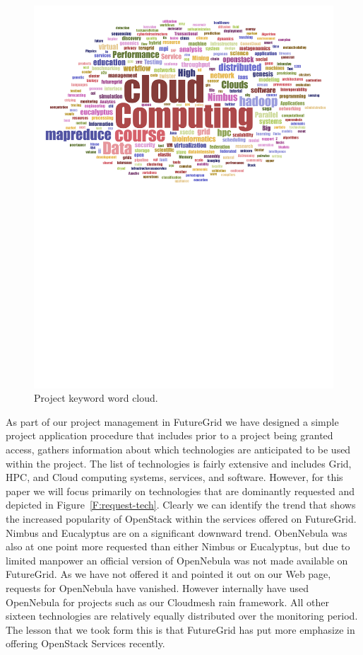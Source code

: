 \documentclass[graybox]{svmult}
\begin{document}
\begin{figure}[p]
\begin{minipage}[t]{1.0\textwidth}
  \centering
    \includegraphics[width=1.0\textwidth]{images/fg-keyword-wordcloud.pdf}
  \caption{Project keyword word cloud.}\label{F:keycloud}
\end{minipage}
\end{figure}




As part of our project management in FutureGrid we have designed a simple project application procedure that includes prior to a project being granted access, gathers information about which technologies are anticipated to be used within the project. The list of technologies is fairly extensive and includes Grid, HPC, and Cloud computing systems, services, and software. However, for this paper we will focus primarily on technologies that are dominantly requested and depicted in Figure~\ref{F:request-tech}. Clearly we can identify the trend that shows the increased popularity of OpenStack within the services offered on FutureGrid. Nimbus and Eucalyptus are on a significant downward trend. ObenNebula was also at one point more requested than either Nimbus or Eucalyptus, but due to limited manpower an official version of OpenNebula was not made available on FutureGrid. As we have not offered it and pointed it out on our Web page, requests for OpenNebula have vanished.  However internally have used OpenNebula for projects such as our Cloudmesh rain framework. All other sixteen technologies are relatively equally distributed over the monitoring period. The lesson that we took form this is that FutureGrid has put more emphasize in offering OpenStack Services recently.
\end{document}
